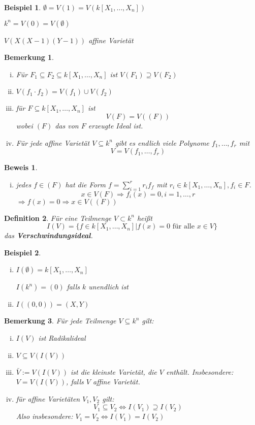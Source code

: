 \documentclass[a4paper, 12pt, numbers=noendperiod, chapterprefix=true, headsepline]{scrbook}
\theoremstyle{break}
\newtheorem{Def}{Definition}[section]
\newtheorem{Bem}[Def]{Bemerkung}
\theoremstyle{nonumberbreak}
\newtheorem{nnBsp}{Beispiel}
\newtheorem{Bew}{Beweis}
\theoremstyle{nonumberplain}
\newcommand{\emp}[1]{\textbf{\emph{#1}}}
\newcommand{\deftermspec}[2]{{\index{#2}}\emp{#1}}
\begin{document}
\begin{nnBsp}
$\emptyset = V(1) = V(k[X_1,\dots ,X_n])$

$k^n = V(0) = V(\emptyset)$

$V(X(X-1)(Y-1))$ affine Variet\"at
\end{nnBsp}

\begin{Bem}\begin{enumerate}[i)]
\item F\"ur $F_1\subseteq F_2 \subseteq k[X_1,\dots ,X_n]$ ist $V(F_1)\supseteq V(F_2)$
\item $V(f_1\cdot f_2) = V(f_1) \cup V(f_2)$
\item f\"ur $F \subseteq k[X_1,\dots ,X_n]$ ist \[V(F) =V((F))\]
	wobei $(F)$ das von $F$ erzeugte Ideal ist.
\item F\"ur jede affine Variet\"at $V\subseteq k^n$ gibt es endlich viele Polynome $f_1,\dots ,f_r$ mit \[V=V(f_1,\dots ,f_r)\]
\end{enumerate}\end{Bem}

\begin{Bew}\begin{enumerate}[i)]\item[iii)]
jedes $f \in(F)$ hat die Form $f= \sum_{i=1}^r r_i f_f$ mit $r_i \in k[X_1,\dots ,X_n], f_i \in F$.\\
\[x\in V(F) \Rightarrow f_i(x)=0, i=1,\dots ,r\]
$\Rightarrow f(x)=0 \Rightarrow x\in V((F))$
\end{enumerate}\end{Bew}

\begin{Def}
F\"ur eine Teilmenge $V\subset k^n$ hei\ss t
	\[I(V)=\{f\in k[X_1,\dots ,X_n] | f(x) = 0\textrm{ f\"ur alle }x\in V\}\]
das \deftermspec{Verschwindungsideal}{Ideal!Verschwindungs-}.
\end{Def}

\begin{nnBsp}\begin{enumerate}[i)]
\item
	$I(\emptyset) = k[X_1,\dots ,X_n]$
	
	$I(k^n) =(0)$ falls $k$ unendlich ist
\item
	$I((0,0)) = (X,Y)$
\end{enumerate}\end{nnBsp}

\begin{Bem}\label{bem2.4}
F\"ur jede Teilmenge $V\subseteq k^n$ gilt:\begin{enumerate}[i)]
\item
	$I(V)$ ist Radikalideal
\item
	$V \subseteq V(I(V))$
\item
	$\bar{V} := V(I(V))$ ist die kleinste Variet\"at, die $V$ enth\"alt. Insbesondere: $V = V(I(V))$, falls $V$ affine Variet\"at.
\item\label{bem2.4.iv}
	f\"ur affine Variet\"aten $V_1,V_2$ gilt:
	\[ V_1 \subseteq V_2 \Leftrightarrow I(V_1) \supseteq I(V_2)\]
	Also insbesondere: $V_1 = V_2 \Leftrightarrow I(V_1) =I(V_2)$
\end{enumerate}\end{Bem}
\end{document}
